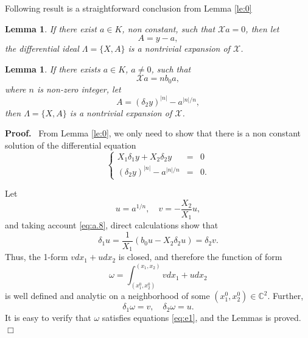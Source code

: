 \documentclass[preprint,12pt]{elsarticle}
\newtheorem{lem}[thm]{Lemma}
\newenvironment{proof}[1][Proof]{\textbf{#1.}\ }{\ $\Box$}
\begin{document}
Following result is a straightforward conclusion from Lemma \ref{le:0}
\begin{lem}
\label{lem:a.0}
If there exist $a\in K$, non constant, such that $\mathscr{X}a  = 0$, then let
$$A = y - a,$$
the differential ideal $\Lambda = \{X,A\}$ is a nontrivial expansion of $\mathscr{X}$.
\end{lem}

\begin{lem}
\label{lem:a.3} If there exists $a\in K$, $a\not=0$, such that
\begin{equation}
\label{eq:a.8} \mathscr{X} a  = nb_0 a,
\end{equation}
where $n$ is non-zero integer, let 
\begin{equation}
A = (\delta_2y)^{|n|} - a^{|n|/n},
\end{equation}
then $\Lambda = \{X, A\}$ is a nontrivial expansion of $\mathscr{X}$.
\end{lem}
\begin{proof} From Lemma \ref{le:0}, we only need to show that there is a non constant solution of the differential equation
\begin{equation}
\label{eq:e1}
\left\{
\begin{array}{rcl}
X_1 \delta_1 y + X_2 \delta_2 y &=& 0\\
(\delta_2y)^{|n|} - a^{|n|/n} &=& 0.
\end{array}\right.
\end{equation} 

Let
$$u = a^{1/n},\quad v = -\dfrac{X_2}{X_1} u,$$
and taking account \eqref{eq:a.8}, direct calculations show that 
$$\delta_1 u = \dfrac{1}{X_1} (b_0 u - X_2 \delta_2 u) = \delta_2 v.$$
Thus, the  1-form $v dx_1 + u d x_2$ is closed, and therefore the function of form
$$\omega = \int_{(x_1^0, x_2^0)}^{(x_1,x_2)} v dx_1 + u dx_2$$
is well defined and analytic on a neighborhood of some $(x_1^0, x_2^0)\in \mathbb{C}^2$.  Further, 
$$\delta_1 \omega= v,\quad \delta_2 \omega= u.$$
It is easy to verify that $\omega$ satisfies equations \eqref{eq:e1}, and the Lemmas is proved.
\end{proof}
\end{document}
